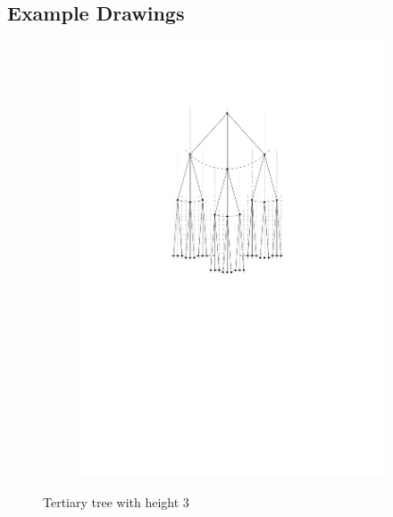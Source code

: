 \subsection{Example Drawings}
\begin{figure}[H]
	\centering
	\begin{subfigure}{\textwidth}
		\centering
		\includegraphics[page=1,width=0.8\linewidth]{graphics/k-ary_tree_example_drawings.pdf}
	\end{subfigure}
	\caption{Tertiary tree with height 3}\label{im:3-ary_tree}
\end{figure}

